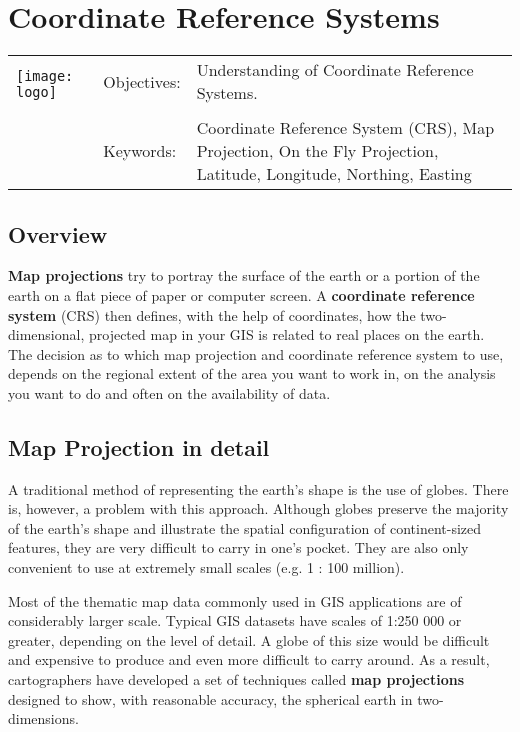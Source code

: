 

\section{Coordinate Reference Systems}\label{sec:crs}
\begin{tabular}{p{3.5cm}p{6cm}p{6cm}}
\multirow{2}{*}{\texttt{[image: logo]}} & Objectives: &
Understanding of Coordinate Reference Systems. \\
& & \\
& Keywords: & 
Coordinate Reference System (CRS), Map Projection, On the Fly Projection,
Latitude, Longitude, Northing, Easting  \\
\hline
\end{tabular}

\subsection{Overview}\label{subsec:overview}

\textbf{Map projections} try to portray the surface of the earth or a portion of the
earth on a flat piece of paper or computer screen. A \textbf{coordinate reference
system} (CRS) then defines, with the help of coordinates, how the
two-dimensional, projected map in your GIS is related to real places on the
earth. The decision as to which map projection and coordinate reference
system to use, depends on the regional extent of the area you want to work
in, on the analysis you want to do and often on the availability of data.

\subsection{Map Projection in detail}

A traditional method of representing the earth's shape is the use of globes.
There is, however, a problem with this approach. Although globes preserve the
majority of the earth's shape and illustrate the spatial configuration of
continent-sized features, they are very difficult to carry in one's pocket.
They are also only convenient to use at extremely small scales (e.g. 1 : 100
million).

Most of the thematic map data commonly used in GIS applications are of
considerably larger scale. Typical GIS datasets have scales of 1:250 000 or
greater, depending on the level of detail. A globe of this size would be
difficult and expensive to produce and even more difficult to carry around.
As a result, cartographers have developed a set of techniques called
\textbf{map projections} designed to show, with reasonable accuracy, the
spherical earth in two-dimensions.

